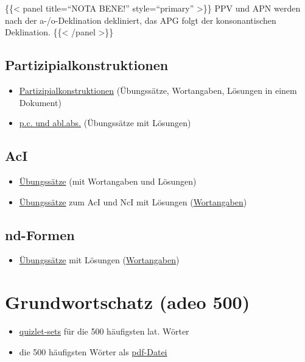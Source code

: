 \documentclass{scrartcl}
\begin{document}
\{\{< panel title="`NOTA BENE!"' style="`primary"' >\}\} PPV und APN werden nach der a-/o-Deklination dekliniert, das APG folgt der konsonantischen Deklination. \{\{< /panel >\}\}

\subsection{Partizipialkonstruktionen}
\label{sec:orge622d40}

\begin{itemize}
\item \href{https://www.dropbox.com/s/7hgaz2130uzlw0d/\%25C2\%25A746Partizipialkonstruktionen.pdf?dl=0}{Partizipialkonstruktionen} (Übungssätze, Wortangaben, Lösungen in
einem Dokument)
\item \href{https://www.dropbox.com/s/9uwdu2l7g1kr8gi/PC\_ablabs2.pdf?dl=0}{p.c. und abl.abs.} (Übungssätze mit Lösungen)
\end{itemize}

\subsection{AcI}
\label{sec:org3a33991}

\begin{itemize}
\item \href{https://www.dropbox.com/s/p3vtu5snnd3z27r/AcI.pdf?dl=0}{Übungssätze} (mit Wortangaben und Lösungen)
\item \href{https://www.dropbox.com/s/4vx8vgcisfx9wll/AcI\_NcI.pdf?dl=0}{Übungssätze} zum AcI und NcI mit Lösungen (\href{https://www.dropbox.com/s/ef0rmrd1262svd3/Wortangaben\_AcI\_NcI.pdf?dl=0}{Wortangaben})
\end{itemize}

\subsection{nd-Formen}
\label{sec:org8d437d3}

\begin{itemize}
\item \href{https://www.dropbox.com/s/ykmw8sncd4x5gly/nd-Formen\_Rep.pdf?dl=0}{Übungssätze} mit Lösungen (\href{https://www.dropbox.com/s/psg50w3n8azfi13/Wortangaben\_nd-Formen.pdf?dl=0}{Wortangaben})
\end{itemize}

\section{Grundwortschatz (adeo 500)}
\label{sec:org344562b}
\begin{itemize}
\item \href{https://quizlet.com/class/1319955/}{quizlet-sets} für die 500 häufigsten lat. Wörter
\item die 500 häufigsten Wörter als \href{https://www.dropbox.com/s/v7m335rmadbrobt/500vocabula.pdf?dl=0}{pdf-Datei}
\end{itemize}
\end{document}
